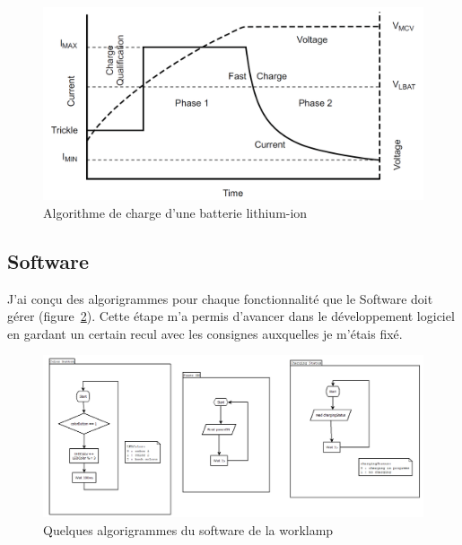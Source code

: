 \documentclass[a4paper, 11pt]{report}
\begin{document}
\begin{figure}[!h]
\begin{center}
\includegraphics[scale=0.7]{figures/screenshots/Li-ion_charge_algortihm.png}
\end{center}
\caption{Algorithme de charge d’une batterie lithium-ion \cite{BQ2000_datasheet}} 
\label{fig:li-ion_charge}
\end{figure}

\subsection{Software}
J'ai conçu des algorigrammes pour chaque fonctionnalité que le Software doit gérer (figure~\ref{fig:flow_chart}). Cette étape m'a permis d'avancer dans le développement logiciel en gardant un certain recul avec les consignes auxquelles je m'étais fixé.

\begin{figure}[!h]
\begin{center}
\includegraphics[scale=0.8]{figures/screenshots/flow_chart.png}
\end{center}
\caption{Quelques algorigrammes du software de la worklamp} 
\label{fig:flow_chart}
\end{figure}
\end{document}
